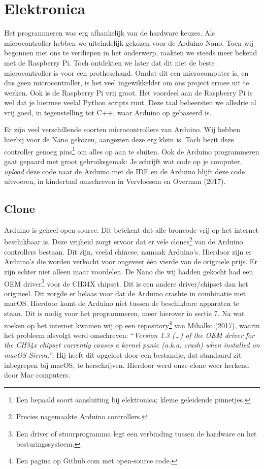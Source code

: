 \hypertarget{elektronica}{%
\section{Elektronica}\label{elektronica}}

Het programmeren was erg afhankelijk van de hardware keuzes. Als
microcontroller hebben we uiteindelijk gekozen voor de Arduino Nano.
Toen wij begonnen met ons te verdiepen in het onderwerp, raakten we
steeds meer bekend met de Raspberry Pi. Toch ontdekten we later dat dit
niet de beste microcontroller is voor een prothesehand. Omdat dit een
microcomputer is, en dus geen microcontroller, is het veel ingewikkelder
om ons project ermee uit te werken. Ook is de Raspberry Pi vrij groot.
Het voordeel aan de Raspberry Pi is wel dat je hiermee veelal Python
scripts runt. Deze taal beheersten we alledrie al vrij goed, in
tegenstelling tot C++, waar Arduino op gebaseerd is.

Er zijn veel verschillende soorten microcontrollers van Arduino. Wij
hebben hierbij voor de Nano gekozen, aangezien deze erg klein is. Toch
bezit deze controller genoeg pins\footnote{Een bepaald soort aansluiting
  bij elektronica; kleine geleidende pinnetjes.} om alles op aan te
sluiten. Ook de Arduino programmeren gaat gepaard met groot
gebruiksgemak: Je schrijft wat code op je computer, \emph{upload} deze
code naar de Arduino met de IDE en de Arduino blijft deze code
uitvoeren, in kindertaal omschreven in Vervloesem en Overman (2017).

\hypertarget{clone}{%
\subsection{Clone}\label{clone}}

Arduino is geheel open-source. Dit betekent dat alle broncode vrij op
het internet beschikbaar is. Deze vrijheid zorgt ervoor dat er vele
clones\footnote{Precies nagemaakte Arduino controllers.} van de Arduino
controllers bestaan. Dit zijn, veelal chinese, namaak Arduino's.
Hierdoor zijn er Arduino's die worden verkocht voor ongeveer één vierde
van de originele prijs. Er zijn echter niet alleen maar voordelen. De
Nano die wij hadden gekocht had een OEM driver\footnote{Een driver of
  stuurprogramma legt een verbinding tussen de hardware en het
  besturingssysteem.} voor de CH34X chipset. Dit is een andere
driver/chipset dan het origineel. Dit zorgde er helaas voor dat de
Arduino crashte in combinatie met macOS. Hierdoor komt de Arduino niet
tussen de beschikbare apparaten te staan. Dit is nodig voor het
programmeren, meer hierover in sectie 7. Na wat zoeken op het internet
kwamen wij op een repository\footnote{Een pagina op Github.com met
  open-source code.} van Mihalko (2017), waarin het probleem alsvolgt
werd omschreven: ``\emph{Version 1.3 (\ldots{}) of the OEM driver for
the CH34x chipset currently causes a kernel panic (a.k.a. crash) when
installed on macOS Sierra.}''. Hij heeft dit opgelost door een
bestandje, dat standaard zit inbegrepen bij macOS, te herschrijven.
Hierdoor werd onze clone weer herkend door Mac computers.

